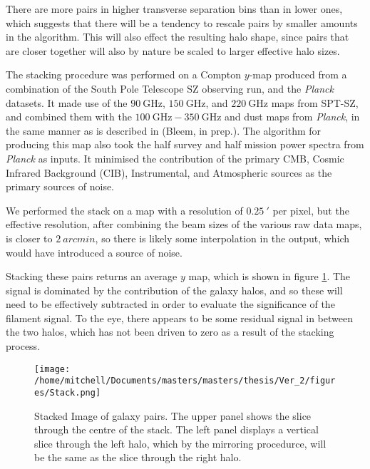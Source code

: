 \par There are more pairs in higher transverse separation bins than in lower ones, which suggests that there will be a tendency to rescale pairs by smaller amounts in the algorithm. This will also effect the resulting halo shape, since pairs that are closer together will also by nature be scaled to larger effective halo sizes.  

The stacking procedure was performed on a Compton $y$-map produced from a combination of the South Pole Telescope SZ observing run, and the \emph{Planck} datasets. It made use of the $\SI{90}{\giga\hertz}$, $\SI{150}{\giga\hertz}$, and $\SI{220}{\giga\hertz}$ maps from SPT-SZ, and combined them with the $\SI{100}{\giga\hertz} - \SI{350}{\giga\hertz}$ and dust maps from \emph{Planck}, in the same manner as is described in \cite{2016ApJS..227...23C} (Bleem, in prep.). The algorithm for producing this map also took the half survey and half mission power spectra from \emph{Planck} as inputs. It minimised the contribution of the primary CMB, Cosmic Infrared Background (CIB), Instrumental, and Atmospheric sources as the primary sources of noise. 

We performed the stack on a map with a resolution of $\SI{0.25}{\arcmin}$ per pixel, but the effective resolution, after combining the beam sizes of the various raw data maps, is closer to $\SI{2}{arcmin}$, so there is likely some interpolation in the output, which would have introduced a source of noise.


Stacking these pairs returns an average $y$ map, which is shown in figure \ref{fig:physical:stack}. The signal is dominated by the contribution of the galaxy halos, and so these will need to be effectively subtracted in order to evaluate the significance of the filament signal. To the eye, there appears to be some residual signal in between the two halos, which has not been driven to zero as a result of the stacking process. 


\begin{figure}[H]
\centering
\texttt{[image: /home/mitchell/Documents/masters/masters/thesis/Ver\_2/figures/Stack.png]}
\caption{Stacked Image of galaxy pairs. The upper panel shows the slice through the centre of the stack. The left panel displays a vertical slice through the left halo, which by the mirroring procedurce, will be the same as the slice through the right halo.}
\label{fig:physical:stack}
\end{figure}

